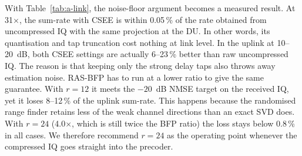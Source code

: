 \begin{table}[H]
\caption{Sum-rate (bit/s/Hz, 8 users) with channel estimates taken from compressed reference-symbol IQ, evaluated on the true channel; change against uncompressed IQ in brackets.}
\label{tab:a-link}
\centering\small
{}
\end{table}

With Table~\ref{tab:a-link}, the noise-floor argument becomes a measured result. At 31$\times$, the sum-rate with CSEE is within 0.05\,\% of the rate obtained from uncompressed IQ with the same projection at the DU. In other words, its quantisation and tap truncation cost nothing at link level. In the uplink at 10--20~dB, both CSEE settings are actually 6--23\,\% better than raw uncompressed IQ. The reason is that keeping only the strong delay taps also throws away estimation noise. RAS-BFP has to run at a lower ratio to give the same guarantee. With $r = 12$ it meets the $-20$~dB NMSE target on the received IQ, yet it loses 8--12\,\% of the uplink sum-rate. This happens because the randomised range finder retains less of the weak channel directions than an exact SVD does. With $r = 24$ (4.0$\times$, which is still twice the BFP ratio) the loss stays below 0.8\,\% in all cases. We therefore recommend $r = 24$ as the operating point whenever the compressed IQ goes straight into the precoder.

